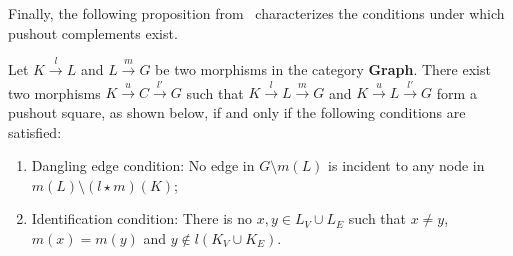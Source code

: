 Finally, the following proposition from~\cite{corradini1997algebraic} characterizes the conditions under which pushout complements exist.
\begin{proposition} 
    \label{prop:existence_of_pushout_complement}
    Let $K \overset{l}{\rightarrow} L$ and $L \overset{m}{\rightarrow} G$ be two morphisms in the category \textbf{Graph}. There exist two morphisms $K \overset{u}{\rightarrow} C \overset{l'}{\rightarrow} G$ such that $K \overset{l}{\rightarrow} L \overset{m}{\rightarrow} G$ and $K \overset{u}{\rightarrow} L \overset{l'}{\rightarrow} G$ form a pushout square, as shown 
    below, 
    if and only if the following conditions are satisfied:
    \begin{enumerate} 
        \item{Dangling edge condition:} 
        No edge in \(G\setminus m(L)\) is incident to any node in \(m(L) \setminus (l \star m)(K)\);
        \item{Identification condition: } There is no $x,y \in L_V \cup L_E$ such that $x \neq y$, $m(x) = m(y)$ and $y \notin l(K_V \cup K_E)$.
    \end{enumerate} 
    \begin{center}
        \end{center}
\end{proposition}
 

